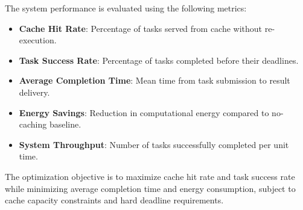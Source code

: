 The system performance is evaluated using the following metrics:

\begin{itemize}
    \item \textbf{Cache Hit Rate}: Percentage of tasks served from cache without re-execution.
    
    \item \textbf{Task Success Rate}: Percentage of tasks completed before their deadlines.
    
    \item \textbf{Average Completion Time}: Mean time from task submission to result delivery.
    
    \item \textbf{Energy Savings}: Reduction in computational energy compared to no-caching baseline.
    
    \item \textbf{System Throughput}: Number of tasks successfully completed per unit time.
\end{itemize}

The optimization objective is to maximize cache hit rate and task success rate while minimizing average completion time and energy consumption, subject to cache capacity constraints and hard deadline requirements.
